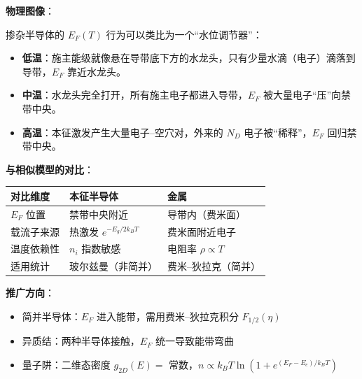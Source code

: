 \begin{insightbox}[物理图像与模型关联]
\textbf{物理图像}：

掺杂半导体的 $E_F(T)$ 行为可以类比为一个``水位调节器''：
\begin{itemize}[nosep]
    \item \textbf{低温}：施主能级就像悬在导带底下方的水龙头，只有少量水滴（电子）滴落到导带，$E_F$ 靠近水龙头。
    \item \textbf{中温}：水龙头完全打开，所有施主电子都进入导带，$E_F$ 被大量电子``压''向禁带中央。
    \item \textbf{高温}：本征激发产生大量电子--空穴对，外来的 $N_D$ 电子被``稀释''，$E_F$ 回归禁带中央。
\end{itemize}

\textbf{与相似模型的对比}：
\begin{center}
\begin{tabular}{lll}
\toprule
\textbf{对比维度} & \textbf{本征半导体} & \textbf{金属} \\
\midrule
$E_F$ 位置 & 禁带中央附近 & 导带内（费米面） \\
载流子来源 & 热激发 $e^{-E_g/2k_BT}$ & 费米面附近电子 \\
温度依赖性 & $n_i$ 指数敏感 & 电阻率 $\rho\propto T$ \\
适用统计 & 玻尔兹曼（非简并） & 费米--狄拉克（简并） \\
\bottomrule
\end{tabular}
\end{center}

\textbf{推广方向}：
\begin{itemize}[nosep]
    \item 简并半导体：$E_F$ 进入能带，需用费米--狄拉克积分 $F_{1/2}(\eta)$
    \item 异质结：两种半导体接触，$E_F$ 统一导致能带弯曲
    \item 量子阱：二维态密度 $g_{2D}(E)=$ 常数，$n\propto k_BT\ln(1+e^{(E_F-E_c)/k_BT})$
\end{itemize}
\end{insightbox}

